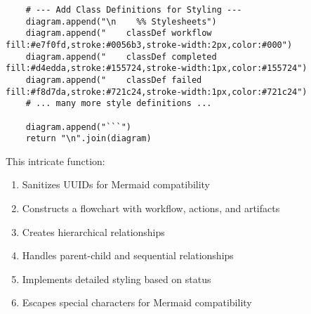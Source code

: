 \documentclass[12pt,a4paper]{article}
\begin{document}
\begin{pageablecode}
\begin{verbatim}
    # --- Add Class Definitions for Styling ---
    diagram.append("\n    %% Stylesheets")
    diagram.append("    classDef workflow fill:#e7f0fd,stroke:#0056b3,stroke-width:2px,color:#000")
    diagram.append("    classDef completed fill:#d4edda,stroke:#155724,stroke-width:1px,color:#155724")
    diagram.append("    classDef failed fill:#f8d7da,stroke:#721c24,stroke-width:1px,color:#721c24")
    # ... many more style definitions ...

    diagram.append("```")
    return "\n".join(diagram)
\end{verbatim}
\end{pageablecode}
This intricate function:
\begin{enumerate}[label=\arabic*.]
    \item Sanitizes UUIDs for Mermaid compatibility
    \item Constructs a flowchart with workflow, actions, and artifacts
    \item Creates hierarchical relationships
    \item Handles parent-child and sequential relationships
    \item Implements detailed styling based on status
    \item Escapes special characters for Mermaid compatibility
\end{enumerate}
\end{document}
